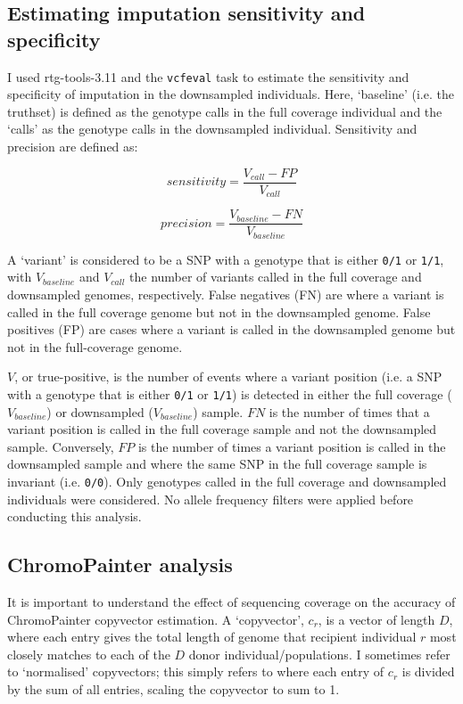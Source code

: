 {\subsection{Estimating imputation sensitivity and specificity}

I used rtg-tools-3.11 \cite{cleary2014joint} and the \texttt{vcfeval} task to estimate the sensitivity and specificity of imputation in the downsampled individuals. Here, `baseline' (i.e. the truthset) is defined as the genotype calls in the full coverage individual and the `calls' as the genotype calls in the downsampled individual. Sensitivity and precision are defined as: 

\begin{equation}
sensitivity = \frac{V_{call}-FP}{V_{call}}
\end{equation}

\begin{equation}
precision = \frac{V_{baseline}-FN}{V_{baseline}}
\end{equation}

A `variant' is considered to be a SNP with a genotype that is either \texttt{0/1} or \texttt{1/1}, with $V_{baseline}$ and $V_{call}$ the number of variants called in the full coverage and downsampled genomes, respectively. False negatives (FN) are where a variant is called in the full coverage genome but not in the downsampled genome. False positives (FP) are cases where a variant is called in the downsampled genome but not in the full-coverage genome.

$V$, or true-positive, is the number of events where a variant position (i.e. a SNP with a genotype that is either \texttt{0/1} or \texttt{1/1}) is detected in either the full coverage ($V_{baseline}$) or downsampled ($V_{baseline}$) sample. $FN$ is the number of times that a variant position is called in the full coverage sample and not the downsampled sample. Conversely, $FP$ is the number of times a variant position is called in the downsampled sample and where the same SNP in the full coverage sample is invariant (i.e. \texttt{0/0}). Only genotypes called in the full coverage and downsampled individuals were considered. No allele frequency filters were applied before conducting this analysis.

\subsection{ChromoPainter analysis} \label{ChromoPainter_analysis}

It is important to understand the effect of sequencing coverage on the accuracy of ChromoPainter copyvector estimation. A `copyvector', $c_{r}$, is a vector of length $D$, where each entry gives the total length of genome that recipient individual $r$ most closely matches to each of the $D$ donor individual/populations. I sometimes refer to `normalised' copyvectors; this simply refers to where each entry of $c_r$ is divided by the sum of all entries, scaling the copyvector to sum to 1. 

}

